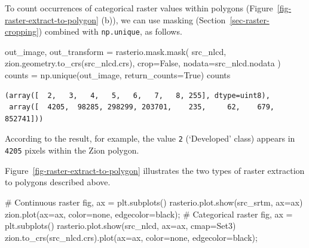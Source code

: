 \documentclass[
  letterpaper,
]{krantz}
\newenvironment{Shaded}{\begin{snugshade}}{\end{snugshade}}
\newcommand{\CommentTok}[1]{\textcolor[rgb]{0.37,0.37,0.37}{#1}}
\newcommand{\NormalTok}[1]{\textcolor[rgb]{0.00,0.23,0.31}{#1}}
\newcommand{\OperatorTok}[1]{\textcolor[rgb]{0.37,0.37,0.37}{#1}}
\newcommand{\StringTok}[1]{\textcolor[rgb]{0.13,0.47,0.30}{#1}}
\newcommand{\VariableTok}[1]{\textcolor[rgb]{0.07,0.07,0.07}{#1}}
\begin{document}
To count occurrences of categorical raster values within polygons
(Figure~\ref{fig-raster-extract-to-polygon} (b)), we can use masking
(Section~\ref{sec-raster-cropping}) combined with \texttt{np.unique}, as
follows.

\begin{Shaded}
\begin{Highlighting}[]
\NormalTok{out\_image, out\_transform }\OperatorTok{=}\NormalTok{ rasterio.mask.mask(}
\NormalTok{    src\_nlcd, }
\NormalTok{    zion.geometry.to\_crs(src\_nlcd.crs), }
\NormalTok{    crop}\OperatorTok{=}\VariableTok{False}\NormalTok{, }
\NormalTok{    nodata}\OperatorTok{=}\NormalTok{src\_nlcd.nodata}
\NormalTok{)}
\NormalTok{counts }\OperatorTok{=}\NormalTok{ np.unique(out\_image, return\_counts}\OperatorTok{=}\VariableTok{True}\NormalTok{)}
\NormalTok{counts}
\end{Highlighting}
\end{Shaded}

\begin{verbatim}
(array([  2,   3,   4,   5,   6,   7,   8, 255], dtype=uint8),
 array([  4205,  98285, 298299, 203701,    235,     62,    679, 852741]))
\end{verbatim}

According to the result, for example, the value \texttt{2} (`Developed'
class) appears in \texttt{4205} pixels within the Zion polygon.

Figure~\ref{fig-raster-extract-to-polygon} illustrates the two types of
raster extraction to polygons described above.

\begin{Shaded}
\begin{Highlighting}[]
\CommentTok{\# Continuous raster}
\NormalTok{fig, ax }\OperatorTok{=}\NormalTok{ plt.subplots()}
\NormalTok{rasterio.plot.show(src\_srtm, ax}\OperatorTok{=}\NormalTok{ax)}
\NormalTok{zion.plot(ax}\OperatorTok{=}\NormalTok{ax, color}\OperatorTok{=}\StringTok{\textquotesingle{}none\textquotesingle{}}\NormalTok{, edgecolor}\OperatorTok{=}\StringTok{\textquotesingle{}black\textquotesingle{}}\NormalTok{)}\OperatorTok{;}
\CommentTok{\# Categorical raster}
\NormalTok{fig, ax }\OperatorTok{=}\NormalTok{ plt.subplots()}
\NormalTok{rasterio.plot.show(src\_nlcd, ax}\OperatorTok{=}\NormalTok{ax, cmap}\OperatorTok{=}\StringTok{\textquotesingle{}Set3\textquotesingle{}}\NormalTok{)}
\NormalTok{zion.to\_crs(src\_nlcd.crs).plot(ax}\OperatorTok{=}\NormalTok{ax, color}\OperatorTok{=}\StringTok{\textquotesingle{}none\textquotesingle{}}\NormalTok{, edgecolor}\OperatorTok{=}\StringTok{\textquotesingle{}black\textquotesingle{}}\NormalTok{)}\OperatorTok{;}
\end{Highlighting}
\end{Shaded}
\end{document}

